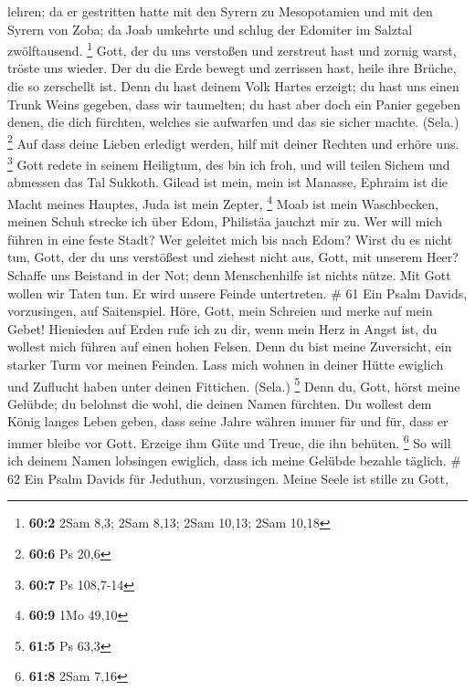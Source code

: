 lehren;  da er gestritten hatte mit den Syrern zu
Mesopotamien und mit den Syrern von Zoba; da Joab umkehrte und schlug
der Edomiter im Salztal zwölftausend. \footnote{\textbf{60:2} 2Sam 8,3;
  2Sam 8,13; 2Sam 10,13; 2Sam 10,18}  Gott, der du uns
verstoßen und zerstreut hast und zornig warst, tröste uns wieder.
 Der du die Erde bewegt und zerrissen hast, heile ihre
Brüche, die so zerschellt ist.  Denn du hast deinem Volk
Hartes erzeigt; du hast uns einen Trunk Weins gegeben, dass wir
taumelten;  du hast aber doch ein Panier gegeben denen,
die dich fürchten, welches sie aufwarfen und das sie sicher machte.
(Sela.) \footnote{\textbf{60:6} Ps 20,6}  Auf dass deine
Lieben erledigt werden, hilf mit deiner Rechten und erhöre uns.
\footnote{\textbf{60:7} Ps 108,7-14}  Gott redete in
seinem Heiligtum, des bin ich froh, und will teilen Sichem und abmessen
das Tal Sukkoth.  Gilead ist mein, mein ist Manasse,
Ephraim ist die Macht meines Hauptes, Juda ist mein Zepter, \footnote{\textbf{60:9}
  1Mo 49,10}  Moab ist mein Waschbecken, meinen Schuh
strecke ich über Edom, Philistäa jauchzt mir zu.  Wer
will mich führen in eine feste Stadt? Wer geleitet mich bis nach Edom?
 Wirst du es nicht tun, Gott, der du uns verstößest und
ziehest nicht aus, Gott, mit unserem Heer?  Schaffe uns
Beistand in der Not; denn Menschenhilfe ist nichts nütze.
 Mit Gott wollen wir Taten tun. Er wird unsere Feinde
untertreten. \# 61  Ein Psalm Davids, vorzusingen, auf
Saitenspiel.  Höre, Gott, mein Schreien und merke auf mein
Gebet!  Hienieden auf Erden rufe ich zu dir, wenn mein
Herz in Angst ist, du wollest mich führen auf einen hohen Felsen.
 Denn du bist meine Zuversicht, ein starker Turm vor
meinen Feinden.  Lass mich wohnen in deiner Hütte ewiglich
und Zuflucht haben unter deinen Fittichen. (Sela.) \footnote{\textbf{61:5}
  Ps 63,3}  Denn du, Gott, hörst meine Gelübde; du
belohnst die wohl, die deinen Namen fürchten.  Du wollest
dem König langes Leben geben, dass seine Jahre währen immer für und für,
 dass er immer bleibe vor Gott. Erzeige ihm Güte und
Treue, die ihn behüten. \footnote{\textbf{61:8} 2Sam 7,16}
 So will ich deinem Namen lobsingen ewiglich, dass ich
meine Gelübde bezahle täglich. \# 62  Ein Psalm Davids für
Jeduthun, vorzusingen.  Meine Seele ist stille zu Gott,
